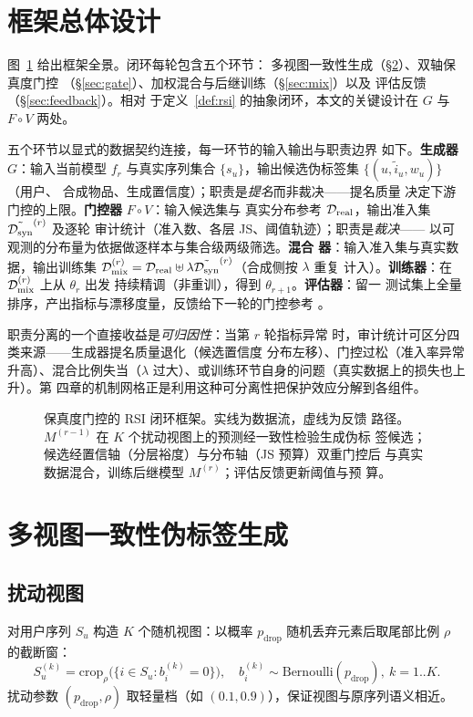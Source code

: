 \section{框架总体设计}
图~\ref{fig:framework} 给出框架全景。闭环每轮包含五个环节：
多视图一致性生成（\S\ref{sec:gen}）、双轴保真度门控
（\S\ref{sec:gate}）、加权混合与后继训练（\S\ref{sec:mix}）以及
评估反馈（\S\ref{sec:feedback}）。相对
于定义~\ref{def:rsi} 的抽象闭环，本文的关键设计在 $G$ 与
$F \circ V$ 两处。

五个环节以显式的数据契约连接，每一环节的输入输出与职责边界
如下。\textbf{生成器} $G$：输入当前模型 $f_r$ 与真实序列集合
$\{s_u\}$，输出候选伪标签集 $\{(u, \tilde{i}_u, w_u)\}$（用户、
合成物品、生成置信度）；职责是\emph{提名}而非裁决——提名质量
决定下游门控的上限。\textbf{门控器} $F \circ V$：输入候选集与
真实分布参考 $\mathcal{D}_{\mathrm{real}}$，输出准入集 $\tilde{\mathcal{D}_{\mathrm{syn}}}^{(r)}$ 及逐轮
审计统计（准入数、各层 JS、阈值轨迹）；职责是\emph{裁决}——
以可观测的分布量为依据做逐样本与集合级两级筛选。\textbf{混合
器}：输入准入集与真实数据，输出训练集 $\mathcal{D}_{\mathrm{mix}}^{(r)} = \mathcal{D}_{\mathrm{real}}
\uplus \lambda \tilde{\mathcal{D}_{\mathrm{syn}}}^{(r)}$（合成侧按 $\lambda$ 重复
计入）。\textbf{训练器}：在 $\mathcal{D}_{\mathrm{mix}}^{(r)}$ 上从 $\theta_r$ 出发
持续精调（非重训），得到 $\theta_{r+1}$。\textbf{评估器}：留一
测试集上全量排序，产出指标与漂移度量，反馈给下一轮的门控参考
。

职责分离的一个直接收益是\emph{可归因性}：当第 $r$ 轮指标异常
时，审计统计可区分四类来源——生成器提名质量退化（候选置信度
分布左移）、门控过松（准入率异常升高）、混合比例失当（$\lambda$
过大）、或训练环节自身的问题（真实数据上的损失也上升）。第
四章的机制网格正是利用这种可分离性把保护效应分解到各组件。

\begin{figure}[t]
\centering

\caption{保真度门控的 RSI 闭环框架。实线为数据流，虚线为反馈
路径。$M^{(r-1)}$ 在 $K$ 个扰动视图上的预测经一致性检验生成伪标
签候选；候选经置信轴（分层裕度）与分布轴（JS 预算）双重门控后
与真实数据混合，训练后继模型 $M^{(r)}$；评估反馈更新阈值与预
算。}
\label{fig:framework}
\end{figure}

\section{多视图一致性伪标签生成}\label{sec:gen}
\subsection{扰动视图}
对用户序列 $S_u$ 构造 $K$ 个随机视图：以概率 $p_{\mathrm{drop}}$
随机丢弃元素后取尾部比例 $\rho$ 的截断窗：
\begin{equation}\label{eq:view}
S_u^{(k)} = \mathrm{crop}_{\rho}\big(
\{i \in S_u : b_i^{(k)} = 0\}\big),\quad
b_i^{(k)} \sim \mathrm{Bernoulli}(p_{\mathrm{drop}}),\ k = 1..K .
\end{equation}
扰动参数 $(p_{\mathrm{drop}}, \rho)$ 取轻量档（如
$(0.1, 0.9)$），保证视图与原序列语义相近。

